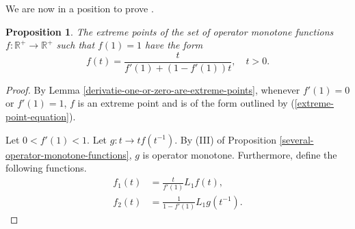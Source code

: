 \documentclass[12pt,a4paper]{amsart}
\newtheorem{proposition}[theorem]{Proposition}
\theoremstyle{definition}
\begin{document}
	We are now in a position to prove \cite[Lemma 4.8]{hansen-fasttrack}.
	
	\begin{proposition}\label{extreme-points-of-operator-monotone-functions-characterised}
		The extreme points of the set of operator monotone functions $f: \mathbb{R}^{+} \rightarrow \mathbb{R}^{+}$ such that $f(1) = 1$ have the form 
		\begin{equation}\label{extreme-point-equation}
			f(t) = \frac{t}{f'(1) + (1-f'(1))t }, \quad t > 0.
		\end{equation}
	\end{proposition}
	\begin{proof}
		By Lemma \ref{derivatie-one-or-zero-are-extreme-points}, whenever $f'(1) = 0$ or $f'(1) = 1$, $f$ is an extreme point and is of the form outlined by (\ref{extreme-point-equation}).
		\par 
		Let $0 < f'(1) < 1$. Let $g: t \rightarrow t f(t^{-1})$. By (III) of Proposition \ref{several-operator-monotone-functions}, $g$ is operator monotone. Furthermore, define the following functions.
		\begin{align*} 
			f_1(t) &= \frac{t}{f'(1)}L_1f(t), \\
			f_2(t) &= \frac{1}{1- f'(1)}L_1g(t^{-1}).
		\end{align*}
		

\end{proof}
\end{document}
